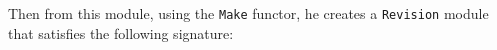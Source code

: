 \documentclass[12pt,twoside,notitlepage]{report}
\begin{document}
Then from this module, using the {\tt Make} functor, he creates a {\tt Revision} module that satisfies the following signature:

\end{document}
